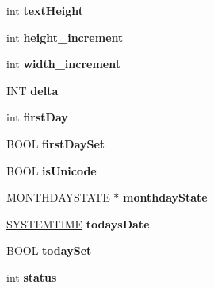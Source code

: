 \begin{DoxyCompactItemize}
int {\bfseries text\+Height}
\item 
\mbox{\label{struct_m_o_n_t_h_c_a_l___i_n_f_o_a03b4884291f136069464dee34a3f213c}} 
int {\bfseries height\+\_\+increment}
\item 
\mbox{\label{struct_m_o_n_t_h_c_a_l___i_n_f_o_aabe3e2a8ee071dfa3e18fa55b41dd076}} 
int {\bfseries width\+\_\+increment}
\item 
\mbox{\label{struct_m_o_n_t_h_c_a_l___i_n_f_o_a6c7f550f4501a98e0135ed9f797044da}} 
I\+NT {\bfseries delta}
\item 
\mbox{\label{struct_m_o_n_t_h_c_a_l___i_n_f_o_acfc17bd2ed74ab6c1690ada79c29933f}} 
int {\bfseries first\+Day}
\item 
\mbox{\label{struct_m_o_n_t_h_c_a_l___i_n_f_o_a5c92709fb7db755cb34ba82a5712d6c9}} 
B\+O\+OL {\bfseries first\+Day\+Set}
\item 
\mbox{\label{struct_m_o_n_t_h_c_a_l___i_n_f_o_af66bdf3fb60c718fdcc74a20ba0d7604}} 
B\+O\+OL {\bfseries is\+Unicode}
\item 
\mbox{\label{struct_m_o_n_t_h_c_a_l___i_n_f_o_af93ba076dbac7a40b1337e72fd41d4cc}} 
M\+O\+N\+T\+H\+D\+A\+Y\+S\+T\+A\+TE $\ast$ {\bfseries monthday\+State}
\item 
\mbox{\label{struct_m_o_n_t_h_c_a_l___i_n_f_o_a723a51173602b8a752141ef822a210dd}} 
\hyperlink{struct___s_y_s_t_e_m_t_i_m_e}{S\+Y\+S\+T\+E\+M\+T\+I\+ME} {\bfseries todays\+Date}
\item 
\mbox{\label{struct_m_o_n_t_h_c_a_l___i_n_f_o_ad6ddb9f951eb1702eb74d8c9c983c3a6}} 
B\+O\+OL {\bfseries today\+Set}
\item 
\mbox{\label{struct_m_o_n_t_h_c_a_l___i_n_f_o_a877903ea2b7fcbc9726437b7b7245487}} 
int {\bfseries status}
\item 
\mbox{\label{struct_m_o_n_t_h_c_a_l___i_n_f_o_ad115225f1c941339cc4a975f4491df73}} 

\end{DoxyCompactItemize}
